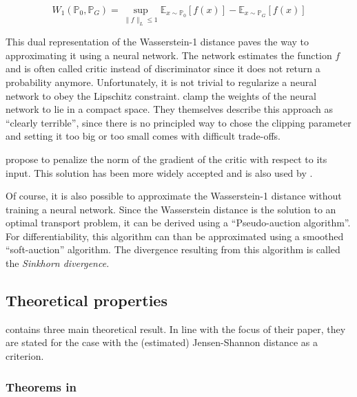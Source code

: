 \begin{theorem}
    \begin{equation}
        W_{1}\left(\mathbb{P}_0, \mathbb{P}_G\right)=\sup _{\|f\|_L \leq 1} \mathbb{E}_{x \sim \mathbb{P}_0}[f(x)]-\mathbb{E}_{x \sim \mathbb{P}_G}[f(x)]
    \end{equation}
\end{theorem}

This dual representation of the Wasserstein-1 distance paves the way to approximating it using a neural network.
The network estimates the function $f$ and is often called critic instead of discriminator since it does not return a probability anymore.
Unfortunately, it is not trivial to regularize a neural network to obey the Lipschitz constraint.
\Textcite{arjovsky2017wassersteingan} clamp the weights of the neural network to lie in a compact space.
They themselves describe this approach as ``clearly terrible'', since there is no principled way to chose the clipping parameter and setting it too big or too small comes with difficult trade-offs. %

\Textcite{gulrajani2017improvedtrainingwassersteingans} propose to penalize the norm of the gradient of the critic with respect to its input.
This solution has been more widely accepted and is also used by \textcite{athey2021using}.

Of course, it is also possible to approximate the Wasserstein-1 distance without training a neural network.
Since the Wasserstein distance is the solution to an optimal transport problem, it can be derived using a ``Pseudo-auction algorithm''.
For differentiability, this algorithm can than be approximated using a smoothed ``soft-auction'' algorithm.
The divergence resulting from this algorithm is called the \textit{Sinkhorn divergence.} %

\subsection{Theoretical properties}
\label{sec:theory}

\textcite{kaji2023adversarial} contains three main theoretical result.
In line with the focus of their paper, they are stated for the case with the (estimated) Jensen-Shannon distance as a criterion.

\subsubsection{Theorems in \cite{kaji2023adversarial}}
\label{sec:theorems_paper}

